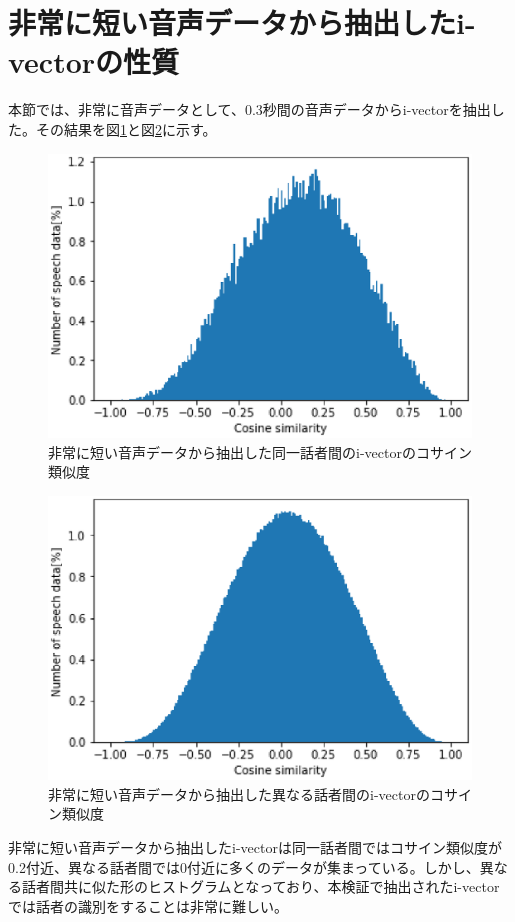 \section{非常に短い音声データから抽出したi-vectorの性質}
本節では、非常に音声データとして、0.3秒間の音声データからi-vectorを抽出した。その結果を図\ref{fig:iv_same_short}と図\ref{fig:iv_other_short}に示す。\par

\begin{figure}[htb]
  \begin{center}
    \includegraphics{../../image/same_sp_short_0_3.eps}
  \end{center}
  \caption{非常に短い音声データから抽出した同一話者間のi-vectorのコサイン類似度}
  \label{fig:iv_same_short}
\end{figure}

\begin{figure}[htb]
  \begin{center}
    \includegraphics{../../image/other_sp_short_0_3.eps}
  \end{center}
  \caption{非常に短い音声データから抽出した異なる話者間のi-vectorのコサイン類似度}
  \label{fig:iv_other_short}
\end{figure}

非常に短い音声データから抽出したi-vectorは同一話者間ではコサイン類似度が0.2付近、異なる話者間では0付近に多くのデータが集まっている。しかし、異なる話者間共に似た形のヒストグラムとなっており、本検証で抽出されたi-vectorでは話者の識別をすることは非常に難しい。
